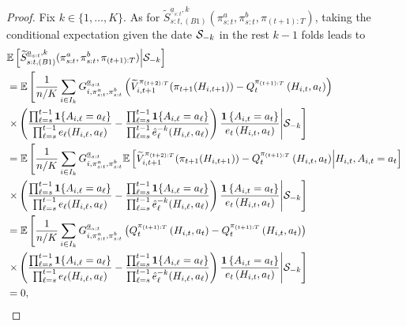 \begin{proof}
Fix $k \in \{1,\ldots,K\}$. As for $  \widetilde{S}_{s:t,(B1)}^{\underline{a}_{s:t},k}(\pi_{s:t}^{a},\pi_{s:t}^{b},\pi_{(t+1):T})$, taking the conditional expectation given the date $\mathcal{S}_{-k}$ in the rest $k-1$ folds leads to 
\begin{align}
&\mathbb{E}\left[ \widetilde{S}_{s:t,(B1)}^{\underline{a}_{s:t},k}(\pi_{s:t}^{a},\pi_{s:t}^{b},\pi_{(t+1):T})\middle|\mathcal{S}_{-k}\right] \nonumber \\
 	&=\mathbb{E}\left[\frac{1}{n/K}\sum_{i \in I_k}G_{i,\pi_{s:t}^{a},\pi_{s:t}^{b}}^{\underline{a}_{s:t}}\left(\widetilde{V}_{i,t+1}^{\pi_{(t+2):T}}(\pi_{t+1}(H_{i,t+1}))-Q_{t}^{\pi_{(t+1):T}}\left(H_{i,t},a_{t}\right)\right)\right. \nonumber \\
 	&\left.\times\left(\frac{\prod_{\ell=s}^{t-1}\mathbf{1}\{A_{i,\ell}=a_{\ell}\}}{\prod_{\ell=s}^{t-1}e_{\ell}(H_{i,\ell},a_{\ell})}-\frac{\prod_{\ell=s}^{t-1}\mathbf{1}\{A_{i,\ell}=a_{\ell}\}}{\prod_{\ell=s}^{t-1}\hat{e}_{\ell}^{-k}(H_{i,\ell},a_{\ell})}\right)\frac{\mathbf{1}\left\{ A_{i,t}=a_{t}\right\} }{e_{t}\left(H_{i,t},a_{t}\right)}\middle|\mathcal{S}_{-k}\right] \nonumber \\
&=	\mathbb{E}\left[\frac{1}{n/K}\sum_{i \in I_k}G_{i,\pi_{s:t}^{a},\pi_{s:t}^{b}}^{\underline{a}_{s:t}}\mathbb{E}\left[\widetilde{V}_{i,t+1}^{\pi_{(t+2):T}}(\pi_{t+1}(H_{i,t+1}))-Q_{t}^{\pi_{(t+1):T}}\left(H_{i,t},a_{t}\right)\middle|H_{i,t},A_{i,t}=a_{t}\right]\right. \nonumber \\
&\left. \times \left(\frac{\prod_{\ell=s}^{t-1}\mathbf{1}\{A_{i,\ell}=a_{\ell}\}}{\prod_{\ell=s}^{t-1}e_{\ell}(H_{i,\ell},a_{\ell})}-\frac{\prod_{\ell=s}^{t-1}\mathbf{1}\{A_{i,\ell}=a_{\ell}\}}{\prod_{\ell=s}^{t-1}\hat{e}_{\ell}^{-k}(H_{i,\ell},a_{\ell})}\right)\frac{\mathbf{1}\left\{ A_{i,t}=a_{t}\right\} }{e_{t}\left(H_{i,t},a_{t}\right)}\middle|\mathcal{S}_{-k}\right] \nonumber \\
&=	\mathbb{E}\left[\frac{1}{n/K}\sum_{i \in I_k}G_{i,\pi_{s:t}^{a},\pi_{s:t}^{b}}^{\underline{a}_{s:t}}\left(Q_{t}^{\pi_{(t+1):T}}\left(H_{i,t},a_{t}\right)-Q_{t}^{\pi_{(t+1):T}}\left(H_{i,t},a_{t}\right)\right)\right. \nonumber \\
&\left.\times \left(\frac{\prod_{\ell=s}^{t-1}\mathbf{1}\{A_{i,\ell}=a_{\ell}\}}{\prod_{\ell=s}^{t-1}e_{\ell}(H_{i,\ell},a_{\ell})}-\frac{\prod_{\ell=s}^{t-1}\mathbf{1}\{A_{i,\ell}=a_{\ell}\}}{\prod_{\ell=s}^{t-1}\hat{e}_{\ell}^{-k}(H_{i,\ell},a_{\ell})}\right)\frac{\mathbf{1}\left\{ A_{i,t}=a_{t}\right\} }{e_{t}\left(H_{i,t},a_{t}\right)}\middle|\mathcal{S}_{-k}\right] \nonumber \\
&=	0, \nonumber
\end{align}

\end{proof}
